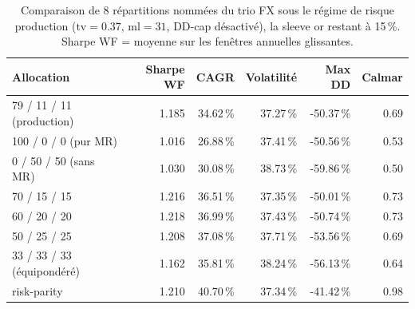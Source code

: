 \begin{table}[H]
\centering
\caption{Comparaison de 8 répartitions nommées du trio FX sous le régime de risque production ($\mathrm{tv}=0.37$, $\mathrm{ml}=31$, DD-cap désactivé), la sleeve or restant à 15\,\%. Sharpe WF = moyenne sur les fenêtres annuelles glissantes.}
\label{tbl:weight_sensitivity_named}
\begin{tabular}{lrrrrr}
\toprule
Allocation & Sharpe WF & CAGR & Volatilité & Max DD & Calmar \\
\midrule
79 / 11 / 11 (production) & 1.185 & 34.62\,\% & 37.27\,\% & -50.37\,\% & 0.69 \\
100 / 0 / 0 (pur MR) & 1.016 & 26.88\,\% & 37.41\,\% & -50.56\,\% & 0.53 \\
0 / 50 / 50 (sans MR) & 1.030 & 30.08\,\% & 38.73\,\% & -59.86\,\% & 0.50 \\
70 / 15 / 15 & 1.216 & 36.51\,\% & 37.35\,\% & -50.01\,\% & 0.73 \\
60 / 20 / 20 & 1.218 & 36.99\,\% & 37.43\,\% & -50.74\,\% & 0.73 \\
50 / 25 / 25 & 1.208 & 37.08\,\% & 37.71\,\% & -53.56\,\% & 0.69 \\
33 / 33 / 33 (équipondéré) & 1.162 & 35.81\,\% & 38.24\,\% & -56.13\,\% & 0.64 \\
risk-parity & 1.210 & 40.70\,\% & 37.34\,\% & -41.42\,\% & 0.98 \\
\bottomrule
\end{tabular}
\end{table}
